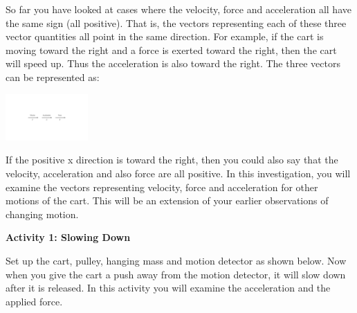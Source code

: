 So far you have looked at cases where the velocity, force and acceleration all
have the same sign (all positive). That is, the vectors representing each of
these three vector quantities all point in the same direction. For example,
if the cart is moving toward the right and a force is exerted toward the right,
then the cart will speed up. Thus the acceleration is also toward the right.
The three vectors can be represented as:

\vspace{0.3cm}
{\par\centering \includegraphics[height=0.7in]{force2/force2_fig1_new.pdf} \par}
\vspace{0.3cm}

If the positive x direction is toward the right, then you could also say that
the velocity, acceleration and also force are all positive. In this investigation,
you will examine the vectors representing velocity, force and acceleration for
other motions of the cart. This will be an extension of your earlier observations
of changing motion.

\textbf{Activity 1: Slowing Down} 

Set up the cart, pulley, hanging mass and motion detector as shown below. Now
when you give the cart a push away from the motion detector, it will slow down
after it is released. In this activity you will examine the acceleration and
the applied force.

